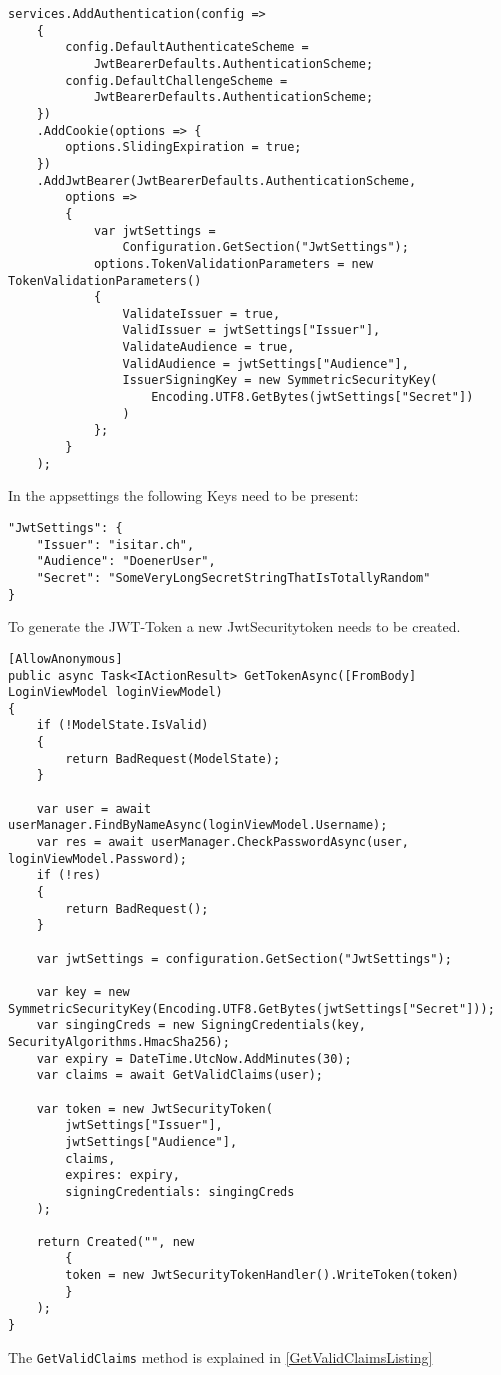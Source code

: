 \documentclass[12pt, a4paper]{article}
\begin{document}
\begin{lstlisting}
services.AddAuthentication(config =>
	{
		config.DefaultAuthenticateScheme =
			JwtBearerDefaults.AuthenticationScheme;
		config.DefaultChallengeScheme =
			JwtBearerDefaults.AuthenticationScheme;
	})
	.AddCookie(options => {
		options.SlidingExpiration = true; 
	})
	.AddJwtBearer(JwtBearerDefaults.AuthenticationScheme,
		options =>
		{
			var jwtSettings =
				Configuration.GetSection("JwtSettings"); 
			options.TokenValidationParameters = new TokenValidationParameters()
			{
				ValidateIssuer = true,
				ValidIssuer = jwtSettings["Issuer"],
				ValidateAudience = true,
				ValidAudience = jwtSettings["Audience"],
				IssuerSigningKey = new SymmetricSecurityKey(
					Encoding.UTF8.GetBytes(jwtSettings["Secret"])
				)
			};
		}
	);
\end{lstlisting}
In the appsettings the following Keys need to be present:
\begin{lstlisting}
"JwtSettings": {
	"Issuer": "isitar.ch",
	"Audience": "DoenerUser",
	"Secret": "SomeVeryLongSecretStringThatIsTotallyRandom"
}
\end{lstlisting}

To generate the JWT-Token a new JwtSecuritytoken needs to be created.
\begin{lstlisting}
[AllowAnonymous]
public async Task<IActionResult> GetTokenAsync([FromBody] LoginViewModel loginViewModel)
{
	if (!ModelState.IsValid)
	{
		return BadRequest(ModelState);
	}
	
	var user = await userManager.FindByNameAsync(loginViewModel.Username);
	var res = await userManager.CheckPasswordAsync(user, loginViewModel.Password);
	if (!res)
	{
		return BadRequest();
	}
	
	var jwtSettings = configuration.GetSection("JwtSettings");
	
	var key = new SymmetricSecurityKey(Encoding.UTF8.GetBytes(jwtSettings["Secret"]));
	var singingCreds = new SigningCredentials(key, SecurityAlgorithms.HmacSha256);
	var expiry = DateTime.UtcNow.AddMinutes(30);
	var claims = await GetValidClaims(user);
	
	var token = new JwtSecurityToken(
		jwtSettings["Issuer"],
		jwtSettings["Audience"],
		claims,
		expires: expiry,
		signingCredentials: singingCreds
	);
	
	return Created("", new
		{
		token = new JwtSecurityTokenHandler().WriteToken(token)
		}
	);
}
\end{lstlisting}
The \lstinline|GetValidClaims| method is explained in \ref{GetValidClaimsListing} 
\end{document}
